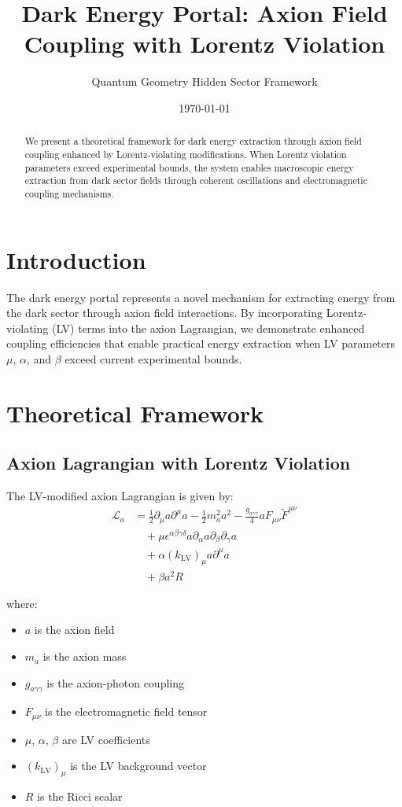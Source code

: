 \documentclass[11pt]{article}
\title{Dark Energy Portal: Axion Field Coupling with Lorentz Violation}
\author{Quantum Geometry Hidden Sector Framework}
\date{\today}
\begin{document}
\maketitle

\begin{abstract}
We present a theoretical framework for dark energy extraction through axion field coupling enhanced by Lorentz-violating modifications. When Lorentz violation parameters exceed experimental bounds, the system enables macroscopic energy extraction from dark sector fields through coherent oscillations and electromagnetic coupling mechanisms.
\end{abstract}

\section{Introduction}

The dark energy portal represents a novel mechanism for extracting energy from the dark sector through axion field interactions. By incorporating Lorentz-violating (LV) terms into the axion Lagrangian, we demonstrate enhanced coupling efficiencies that enable practical energy extraction when LV parameters $\mu$, $\alpha$, and $\beta$ exceed current experimental bounds.

\section{Theoretical Framework}

\subsection{Axion Lagrangian with Lorentz Violation}

The LV-modified axion Lagrangian is given by:
\begin{align}
\mathcal{L}_a &= \frac{1}{2}\partial_\mu a \partial^\mu a - \frac{1}{2}m_a^2 a^2 - \frac{g_{a\gamma\gamma}}{4}a F_{\mu\nu}\tilde{F}^{\mu\nu} \\
&\quad + \mu \epsilon^{\alpha\beta\gamma\delta} a \partial_\alpha a \partial_\beta \partial_\gamma a \\
&\quad + \alpha (k_{\text{LV}})_\mu a \partial^\mu a \\
&\quad + \beta a^2 R
\end{align}

where:
\begin{itemize}
\item $a$ is the axion field
\item $m_a$ is the axion mass
\item $g_{a\gamma\gamma}$ is the axion-photon coupling
\item $F_{\mu\nu}$ is the electromagnetic field tensor
\item $\mu$, $\alpha$, $\beta$ are LV coefficients
\item $(k_{\text{LV}})_\mu$ is the LV background vector
\item $R$ is the Ricci scalar
\end{itemize}
\end{document}
